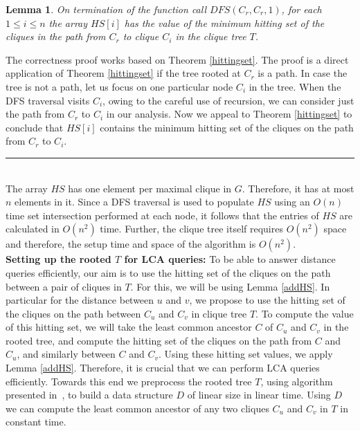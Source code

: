 \documentclass[MS,synopsis]{iitmdiss}
\newtheorem{lemma}[theorem]{Lemma}
\newcommand{\qed}{\rule{7pt}{7pt}}
\newenvironment{proof}{\noindent{\bf Proof}\hspace*{1em}}{\hfill\qed\bigskip}
\begin{document}
 \begin{lemma} \label{dfsoutput}
 On termination of the function call $DFS(C_r,C_r,1)$, for each $1 \leq i \leq n$ the array $HS[i]$ has the value of the
 minimum hitting set of  the cliques in the path from $C_r$ to clique $C_i$ in the clique tree $T$.
 \end{lemma} 
 \begin{proof}
 The correctness proof works based on Theorem \ref{hittingset}. 
 The proof is a direct application of Theorem \ref{hittingset} if the tree rooted at $C_r$ is a path. 
 In case the tree is not a path, let us focus on one particular node $C_i$ in the tree. 
 When the DFS traversal visits $C_i$, owing to the careful use of recursion, we can consider just the path from $C_r$ to $C_i$ in our analysis.
 Now we appeal to Theorem \ref{hittingset} to conclude that $HS[i]$ contains the minimum hitting set of the cliques on the path from $C_r$ to $C_i$.
\end{proof}
\\

 The array $HS$ has one element per maximal clique in $G$. Therefore, it has at most $n$ elements in it.  
 Since a DFS traversal is used to populate $HS$ using an $O(n)$ time set intersection performed at each node, 
 it follows that the entries of $HS$ are calculated in $O(n^2)$ time.
 Further, the clique tree itself requires $O(n^2)$ space and therefore, the setup time and space of the algorithm is $O(n^2)$. \\   

 {\bf Setting up the rooted $T$ for LCA queries:} To be able to answer distance queries efficiently, 
 our aim is to use the hitting set  of the cliques on the path between a pair of cliques in $T$. 
 For this, we will be using Lemma \ref{addHS}. In particular for the distance between $u$ and $v$, 
 we propose to use the hitting set of the cliques on the path between $C_u$ and $C_v$ in clique tree $T$. 
 To compute the value of this hitting set, we will
 take the least common ancestor $C$ of $C_u$ and $C_v$ in the rooted tree,
 and compute the hitting set of the cliques on the path from $C$ and $C_u$, 
 and similarly between $C$ and $C_v$. Using these hitting set values, we apply Lemma \ref{addHS}. 
 Therefore, it is crucial that we can perform LCA queries efficiently. 
 Towards this end we preprocess the rooted tree $T$, using algorithm presented in~\cite{lcabyvishkin}, 
 to build a data structure $D$ of linear size in linear time. Using $D$ we can compute the 
 least common ancestor of any two cliques $C_u$ and $C_v$ in $T$ in constant time.  \\
 
\end{document}

